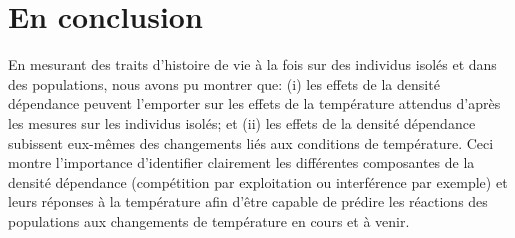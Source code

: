 \section{En conclusion}

En mesurant des traits d'histoire de vie à la fois sur des individus isolés et
dans des populations, nous avons pu montrer que: (i) les effets de la densité
dépendance peuvent l'emporter sur les effets de la température attendus d'après
les mesures sur les individus isolés; et (ii) les effets de la densité
dépendance subissent eux-mêmes des changements liés aux conditions de
température. Ceci montre l'importance d'identifier clairement les différentes
composantes de la densité dépendance (compétition par exploitation ou
interférence par exemple) et leurs réponses à la température afin d'être capable
de prédire les réactions des populations aux changements de température en cours
et à venir. 
